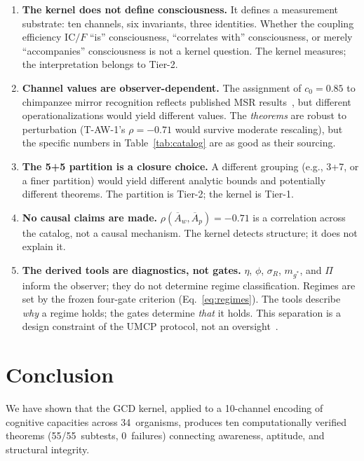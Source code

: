 \documentclass[
  aps,
  prd,
  twocolumn,
  superscriptaddress,
  nofootinbib,
  floatfix
]{revtex4-2}
\newcommand{\IC}{\mathrm{IC}}
\newcommand{\Aw}{\overline{A}_{\!w}}
\newcommand{\Ap}{\overline{A}_{\!p}}
\begin{document}
\begin{enumerate}
\item \textbf{The kernel does not define consciousness.}
  It defines a measurement substrate: ten channels, six
  invariants, three identities.  Whether the coupling
  efficiency $\IC/F$ ``is'' consciousness, ``correlates with''
  consciousness, or merely ``accompanies'' consciousness is
  not a kernel question.  The kernel measures; the
  interpretation belongs to Tier-2.

\item \textbf{Channel values are observer-dependent.}
  The assignment of $c_0 = 0.85$ to chimpanzee mirror
  recognition reflects published MSR
  results~\cite{gallup1970}, but different operationalizations
  would yield different values.  The \emph{theorems} are robust
  to perturbation (T-AW-1's $\rho = -0.71$ would survive
  moderate rescaling), but the specific numbers in
  Table~\ref{tab:catalog} are as good as their sourcing.

\item \textbf{The 5+5 partition is a closure choice.}
  A different grouping (e.g., 3+7, or a finer partition)
  would yield different analytic bounds and potentially
  different theorems.  The partition is Tier-2; the kernel
  is Tier-1.

\item \textbf{No causal claims are made.}
  $\rho(\Aw, \Ap) = -0.71$ is a correlation across the
  catalog, not a causal mechanism.  The kernel detects
  structure; it does not explain it.

\item \textbf{The derived tools are diagnostics, not gates.}
  $\eta$, $\phi$, $\sigma_R$, $m_{g^*}$, and $\Pi$
  inform the observer; they do not determine regime
  classification.  Regimes are set by the frozen
  four-gate criterion (Eq.~\ref{eq:regimes}).  The
  tools describe \emph{why} a regime holds; the gates
  determine \emph{that} it holds.  This separation is
  a design constraint of the UMCP protocol, not an
  oversight~\cite{paulus2025umcp}.
\end{enumerate}

\section{Conclusion}\label{sec:conclusion}

We have shown that the GCD kernel, applied to a 10-channel
encoding of cognitive capacities across 34~organisms, produces
ten computationally verified theorems (55/55~subtests,
0~failures) connecting awareness, aptitude, and structural
integrity.
\end{document}
